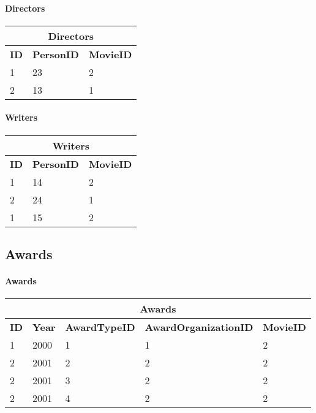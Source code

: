 \paragraph{Directors}

\begin{center}
\begin{tabular}{|l|l|l|}
\hline
\multicolumn{3}{|c|}{Directors} \\ \hline \hline
\textbf{ID} & \textbf{PersonID} & \textbf{MovieID} \\ \hline \hline
1 & 23 & 2 \\ \hline
2 & 13 & 1 \\ \hline
\end{tabular}
\end{center}

\paragraph{Writers}

\begin{center}
\begin{tabular}{|l|l|l|}
\hline
\multicolumn{3}{|c|}{Writers} \\ \hline \hline
\textbf{ID} & \textbf{PersonID} & \textbf{MovieID} \\ \hline \hline
1 & 14 & 2 \\ \hline
2 & 24 & 1 \\ \hline
1 & 15 & 2 \\ \hline
\end{tabular}
\end{center}

\subsection{Awards}

\paragraph{Awards}
\begin{center}
\begin{tabular}{|l|l|l|l|l|}
\hline
\multicolumn{5}{|c|}{Awards} \\ \hline \hline
\textbf{ID} & \textbf{Year} & \textbf{AwardTypeID} & \textbf{AwardOrganizationID} & \textbf{MovieID} \\ \hline \hline
1 & 2000 & 1 & 1 & 2 \\ \hline
2 & 2001 & 2 & 2 & 2 \\ \hline
2 & 2001 & 3 & 2 & 2 \\ \hline
2 & 2001 & 4 & 2 & 2 \\ \hline
\end{tabular}
\end{center}

